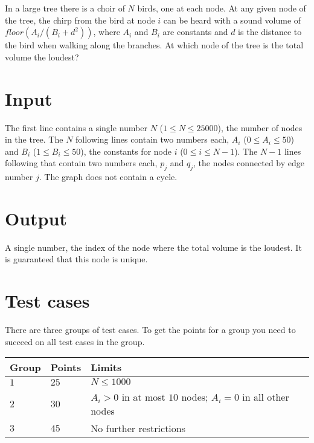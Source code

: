 In a large tree there is a choir of $N$ birds, one at each node. At any given node of the tree, the chirp from the bird at node $i$ can be heard with a sound volume of $floor(A_i / (B_i + d^2))$, where $A_i$ and $B_i$ are constants and $d$ is the distance to the bird when walking along the branches. At which node of the tree is the total volume the loudest?

\section*{Input}
The first line contains a single number $N$ ($1 \le N \le 25000$), the number of nodes in the tree. The $N$ following lines contain two numbers each, $A_i$ ($0 \le A_i \le 50$) and $B_i$ ($1 \le B_i \le 50$), the constants for node $i$ ($0 \le i \le N-1$). The $N-1$ lines following that contain two numbers each, $p_j$ and $q_j$, the nodes connected by edge number $j$. The graph does not contain a cycle.

\section*{Output}
A single number, the index of the node where the total volume is the loudest. It is guaranteed that this node is unique.

\section*{Test cases}
There are three groups of test cases. To get the points for a group you need to succeed on all test cases in the group.

\noindent
\begin{tabular}{| l | l | l |}
  \hline
  Group & Points & Limits                                                      \\ \hline
  $1$   & $25$   & $N \le 1000$                                                \\ \hline
  $2$   & $30$   & $A_i > 0$ in at most $10$ nodes; $A_i=0$ in all other nodes \\ \hline
  $3$   & $45$   & No further restrictions                                     \\ \hline
\end{tabular}
